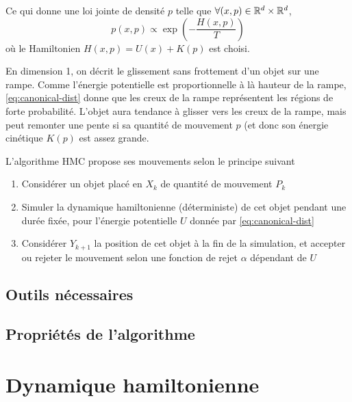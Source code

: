 \documentclass[10pt,a4paper]{article}
\begin{document}
Ce qui donne une loi jointe de densité $p$ telle que $\forall (x,p) \in \mathbb{R}^d \times \mathbb{R}^d$, 
\begin{equation}\label{eq:canonical-dist}
p(x,p) \propto \exp \left( -\frac{H(x,p)}{T} \right)
\end{equation}
où le Hamiltonien $H(x,p) = U(x) + K(p)$ est choisi.

\begin{Rque}
En dimension 1, on décrit le glissement sans frottement d'un objet sur une rampe. Comme l'énergie potentielle est proportionnelle à là hauteur de la rampe, \eqref{eq:canonical-dist} donne que les creux de la rampe représentent les régions de forte probabilité. L'objet aura tendance à glisser vers les creux de la rampe, mais peut remonter une pente si sa quantité de mouvement $p$ (et donc son énergie cinétique $K(p)$ est assez grande.
\end{Rque}

L'algorithme HMC propose ses mouvements selon le principe suivant
\begin{enumerate}
  \item Considérer un objet placé en $X_k$ de quantité de mouvement $P_k$
  \item Simuler la dynamique hamiltonienne (déterministe) de cet objet pendant une durée fixée, pour l'énergie potentielle $U$ donnée par \eqref{eq:canonical-dist}
  \item Considérer $Y_{k+1}$ la position de cet objet à la fin de la simulation, et accepter ou rejeter le mouvement selon une fonction de rejet $\alpha$ dépendant de $U$
\end{enumerate}

\subsection{Outils nécessaires}


\subsection{Propriétés de l'algorithme}


\section{Dynamique hamiltonienne}
\end{document}
